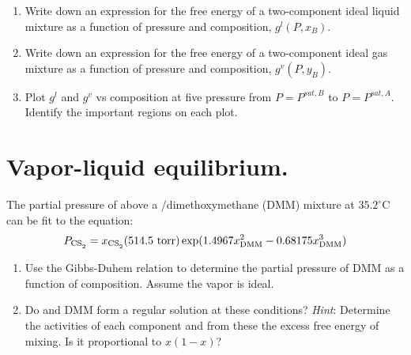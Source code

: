 \documentclass[11pt]{article}
\begin{document}
\begin{enumerate}
\item Write down an expression for the free energy of a two-component ideal liquid mixture as
a function of pressure and composition, \(g^{l}(P,x_{B})\).
\item Write down an expression for the free energy of a two-component ideal gas mixture as a
function of pressure and composition, \(g^{v}(P,y_{B})\).
\item Plot \(g^{l}\) and \(g^{v}\) vs composition at five pressure from \(P = P^{sat,B}\) to
\(P = P^{sat,A}\).  Identify the important regions on each plot.
\end{enumerate}

\section{Vapor-liquid equilibrium.}
\label{sec:org0bff893}
The partial pressure of  above a
  /dimethoxymethane (DMM) mixture at \(35.2^\circ\)C can be fit to the equation:
\begin{equation*}
  P_{\ce{CS2}} = x_{\ce{CS2}} (514.5~\text{torr}) \exp ( 1.4967 x_{\text{DMM}}^2 - 0.68175 x_{\text{DMM}}^3)
\end{equation*}

\begin{enumerate}
\item Use the Gibbs-Duhem relation to determine the partial pressure of DMM as a
function of composition.  Assume the vapor is ideal.
\item Do  and DMM form a regular solution at these conditions?  \emph{Hint}: Determine the activities of each component and from these the excess free energy of mixing.  Is it proportional to \(x(1-x)\)?
\end{enumerate}
\end{document}
